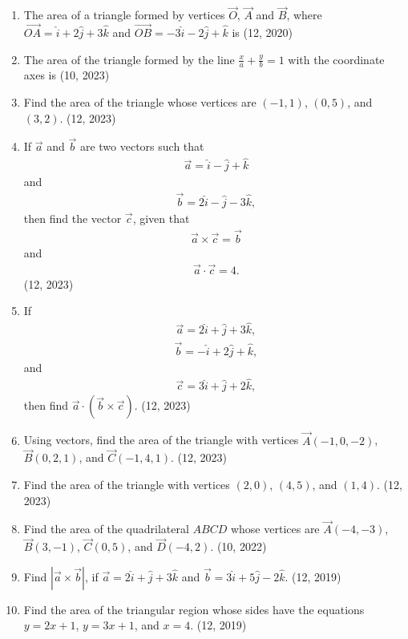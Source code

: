 \begin{enumerate}[label=\thesubsection.\arabic*,ref=\thesubsection.\theenumi]
\item The area of a triangle formed by vertices $\vec{O}$, $\vec{A}$ and $\vec{B}$, where $\overrightarrow{OA}= \hat{i}+2 \hat{j}+3\hat{k}$ and $\overrightarrow{OB}= -3\hat{i} - 2\hat{j} + \hat{k}$ is
\hfill (12, 2020)
    \item The area of the triangle formed by the line $ \frac{x}{a} + \frac{y}{b} = 1 $ with the coordinate axes is 
    \hfill (10, 2023)
    \item  Find the area of the triangle whose vertices are $(-1, 1)$, $(0, 5)$, and $(3, 2)$.
    \hfill (12, 2023)
    \item If $\overrightarrow{a}$ and $\overrightarrow{b}$ are two vectors such that
    \begin{align}
        \overrightarrow{a} = \hat{i} - \hat{j} + \hat{k}
    \end{align}
    and
    \begin{align}
        \overrightarrow{b} = 2\hat{i} - \hat{j} - 3\hat{k},
    \end{align}
    then find the vector $\overrightarrow{c}$, given that
    \begin{align}
        \overrightarrow{a} \times \overrightarrow{c} = \overrightarrow{b}
    \end{align}
    and
    \begin{align}
        \overrightarrow{a} \cdot \overrightarrow{c} = 4.
    \end{align}
    \hfill (12, 2023)
    \item If
    \begin{align}
        \overrightarrow{a} = 2\hat{i} + \hat{j} + 3\hat{k},
    \end{align}
    \begin{align}
        \overrightarrow{b} = -\hat{i} + 2\hat{j} + \hat{k},
    \end{align}
    and
    \begin{align}
        \overrightarrow{c} = 3\hat{i} + \hat{j} + 2\hat{k},
    \end{align}
    then find $\overrightarrow{a} \cdot (\overrightarrow{b} \times \overrightarrow{c})$.
    \hfill (12, 2023)
    \item Using vectors, find the area of the triangle with vertices $\vec{A}(-1, 0, -2)$, $\vec{B}(0, 2, 1)$, and $\vec{C}(-1, 4, 1)$.
    \hfill (12, 2023)

    \item Find the area of the triangle with vertices $(2, 0)$, $(4, 5)$, and $(1, 4)$.
    \hfill (12, 2023)
    \item Find the area of the quadrilateral $ABCD$ whose vertices are $\vec{A}(-4, -3)$, $\vec{B}(3, -1)$, $\vec{C}(0, 5)$, and $\vec{D}(-4, 2)$.
    \hfill (10, 2022)
	\item Find $|\overrightarrow{a} \times \overrightarrow{b}|$, if $\overrightarrow{a} = 2\hat{i} + \hat{j} + 3\hat{k}$ and $\overrightarrow{b} = 3\hat{i} + 5\hat{j} - 2\hat{k}$. \hfill (12, 2019)
	\item Find the area of the triangular region whose sides have the equations $y = 2x + 1$, $y = 3x + 1$, and $x = 4$. \hfill (12, 2019)
	

\end{enumerate}
